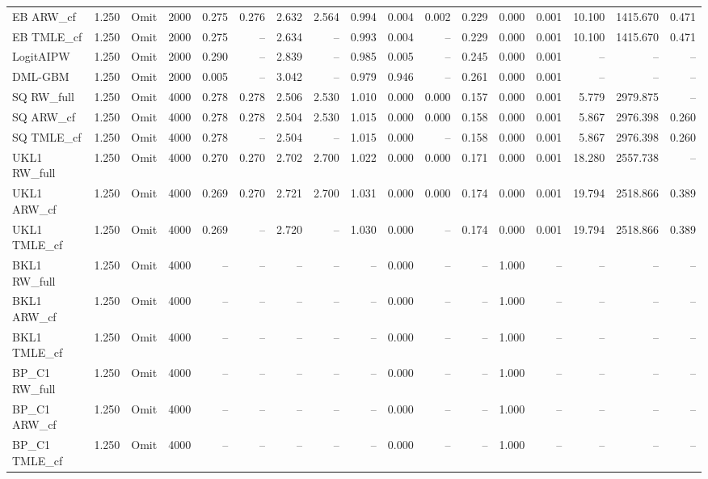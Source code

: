 \begin{tabular}{llllrrrrrrrrrrrrr}
EB ARW\_cf & 1.250 & Omit & 2000 & 0.275 & 0.276 & 2.632 & 2.564 & 0.994 & 0.004 & 0.002 & 0.229 & 0.000 & 0.001 & 10.100 & 1415.670 & 0.471 \\
EB TMLE\_cf & 1.250 & Omit & 2000 & 0.275 & -- & 2.634 & -- & 0.993 & 0.004 & -- & 0.229 & 0.000 & 0.001 & 10.100 & 1415.670 & 0.471 \\
LogitAIPW & 1.250 & Omit & 2000 & 0.290 & -- & 2.839 & -- & 0.985 & 0.005 & -- & 0.245 & 0.000 & 0.001 & -- & -- & -- \\
DML-GBM & 1.250 & Omit & 2000 & 0.005 & -- & 3.042 & -- & 0.979 & 0.946 & -- & 0.261 & 0.000 & 0.001 & -- & -- & -- \\
SQ RW\_full & 1.250 & Omit & 4000 & 0.278 & 0.278 & 2.506 & 2.530 & 1.010 & 0.000 & 0.000 & 0.157 & 0.000 & 0.001 & 5.779 & 2979.875 & -- \\
SQ ARW\_cf & 1.250 & Omit & 4000 & 0.278 & 0.278 & 2.504 & 2.530 & 1.015 & 0.000 & 0.000 & 0.158 & 0.000 & 0.001 & 5.867 & 2976.398 & 0.260 \\
SQ TMLE\_cf & 1.250 & Omit & 4000 & 0.278 & -- & 2.504 & -- & 1.015 & 0.000 & -- & 0.158 & 0.000 & 0.001 & 5.867 & 2976.398 & 0.260 \\
UKL1 RW\_full & 1.250 & Omit & 4000 & 0.270 & 0.270 & 2.702 & 2.700 & 1.022 & 0.000 & 0.000 & 0.171 & 0.000 & 0.001 & 18.280 & 2557.738 & -- \\
UKL1 ARW\_cf & 1.250 & Omit & 4000 & 0.269 & 0.270 & 2.721 & 2.700 & 1.031 & 0.000 & 0.000 & 0.174 & 0.000 & 0.001 & 19.794 & 2518.866 & 0.389 \\
UKL1 TMLE\_cf & 1.250 & Omit & 4000 & 0.269 & -- & 2.720 & -- & 1.030 & 0.000 & -- & 0.174 & 0.000 & 0.001 & 19.794 & 2518.866 & 0.389 \\
BKL1 RW\_full & 1.250 & Omit & 4000 & -- & -- & -- & -- & -- & 0.000 & -- & -- & 1.000 & -- & -- & -- & -- \\
BKL1 ARW\_cf & 1.250 & Omit & 4000 & -- & -- & -- & -- & -- & 0.000 & -- & -- & 1.000 & -- & -- & -- & -- \\
BKL1 TMLE\_cf & 1.250 & Omit & 4000 & -- & -- & -- & -- & -- & 0.000 & -- & -- & 1.000 & -- & -- & -- & -- \\
BP\_C1 RW\_full & 1.250 & Omit & 4000 & -- & -- & -- & -- & -- & 0.000 & -- & -- & 1.000 & -- & -- & -- & -- \\
BP\_C1 ARW\_cf & 1.250 & Omit & 4000 & -- & -- & -- & -- & -- & 0.000 & -- & -- & 1.000 & -- & -- & -- & -- \\
BP\_C1 TMLE\_cf & 1.250 & Omit & 4000 & -- & -- & -- & -- & -- & 0.000 & -- & -- & 1.000 & -- & -- & -- & -- \\

\end{tabular}
